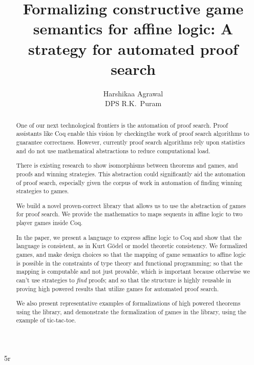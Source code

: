 5r\documentclass{article}
\title{Formalizing constructive game semantics for affine logic: A strategy for automated proof search}
\author{Harshikaa Agrawal \\ \small DPS R.K.\ Puram}
\date{}
\theoremstyle{definition}
\begin{document}
\linespread{1.2}

\maketitle

\begin{abstract}
    


One of our next technological frontiers is the automation of proof search. Proof assistants like Coq enable this vision by checkingthe work of proof search algorithms to guarantee correctness. However, currently proof search algorithms rely upon statistics and do not use mathematical abstractions to reduce computational load. 

There is existing research to show isomorphisms between theorems and games, and proofs and winning strategies. This abstraction could significantly aid the automation of proof search, especially given the corpus of work in automation of finding winning strategies to games.

We build a novel proven-correct library that allows us to use the abstraction of games for proof search. We provide the mathematics to maps sequents in affine logic to two player games inside Coq. 

In the paper, we present a language to express affine logic to Coq and show that the language is consistent, as in Kurt Gödel or model theoretic consistency.  We formalized games, and make design choices so that the mapping of game semantics to affine logic is possible in the constraints of type theory and functional programming; so that the mapping is computable and not just provable, which is important because otherwise we can’t use strategies to \emph{find} proofs; and so that the structure is highly reusable in proving high powered results that utilize games for automated proof search.

We also present representative examples of formalizations of high powered theorems using the library, and demonstrate the formalization of games in the library, using the example of tic-tac-toe.

\end{abstract}

\clearpage
\begin{doublespace}
\tableofcontents
\end{doublespace}

\begin{comment}

Table of contents
Introduction: Opportunity, Our Idea, Our Contribution
Project Background: Proof Assistants, Affine Logic, Modelling proofs through game semantics, Summary
Library Design: Affine Logic, Model of Affine Logic, Formal Game, Seminal definition 
Examples: Theorems, Games
Acknowledgments 
Bibliography
\end{comment}
\end{document}
